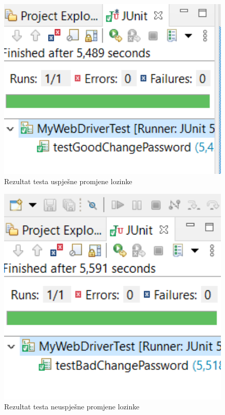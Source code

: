 			\begin{figure}[hp]
                    \centering
                    \includegraphics[width=15cm]{slike/passwordgood.png}
                    \caption{Rezultat testa uspješne promjene lozinke}
                    \label{fig:useCase-2}
                \end{figure}
			\eject
			
			\begin{figure}[hp]
                    \centering
                    \includegraphics[width=15cm]{slike/passwordbad.png}
                    \caption{Rezultat testa neuspješne promjene lozinke}
                    \label{fig:useCase-2}
                \end{figure}
			\eject
			

